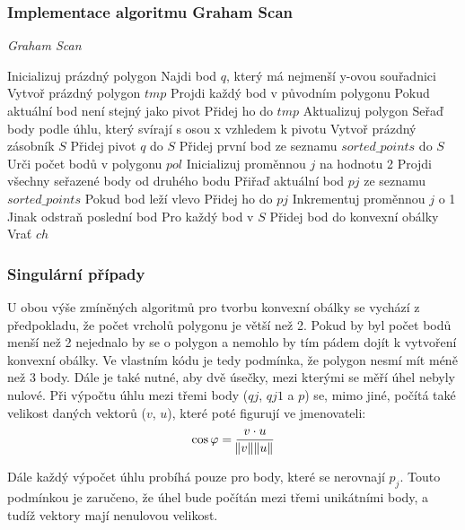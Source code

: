 \documentclass{article}
\begin{document}
\begin{spacing}{1.5}
\subsubsection*{Implementace algoritmu Graham Scan}
\begin{algorithm}
    \caption {\textit{Graham Scan}}
    \begin{algorithmic}[1]
        \State Inicializuj prázdný polygon
        \State Najdi bod $q$, který má nejmenší y-ovou souřadnici
        \State Vytvoř prázdný polygon $tmp$
        \State Projdi každý bod v původním polygonu
        \State \indent	Pokud aktuální bod není stejný jako pivot
        \State \indent	\indent	Přidej ho do $tmp$
        \State Aktualizuj polygon
        \State Seřaď body podle úhlu, který svírají s osou x vzhledem k pivotu
        \State Vytvoř prázdný zásobník $S$
        \State Přidej pivot $q$ do $S$
        \State Přidej první bod ze seznamu $sorted\_points$ do $S$
        \State Urči počet bodů v polygonu $pol$
        \State Inicializuj proměnnou $j$ na hodnotu 2
        \State Projdi všechny seřazené body od druhého bodu
        \State \indent	Přiřaď aktuální bod $pj$ ze seznamu $sorted\_points$
        \State \indent	Pokud bod leží vlevo
        \State \indent	\indent	Přidej ho do $pj$
        \State \indent	\indent	Inkrementuj proměnnou $j$ o 1
        \State \indent	Jinak odstraň poslední bod 
        \State Pro každý bod v $S$
        \State \indent	Přidej bod do konvexní obálky
        \State Vrať $ch$
    \end{algorithmic}
\end{algorithm}


\subsubsection{Singulární případy}
U obou výše zmíněných algoritmů pro tvorbu konvexní obálky se vychází z předpokladu, že počet vrcholů polygonu je větší než 2. Pokud by byl počet bodů menší než 2 nejednalo by se o polygon a nemohlo by tím pádem dojít k vytvoření konvexní obálky. Ve vlastním kódu je tedy podmínka, že polygon nesmí mít méně než 3 body.
Dále je také nutné, aby dvě úsečky, mezi kterými se měří úhel nebyly nulové. Při výpočtu úhlu mezi třemi body ($qj$, $qj1$ a $p$) se, mimo jiné, počítá také velikost daných vektorů ($v$, $u$), které poté figurují ve jmenovateli:
$$\cos\varphi=\frac{v \cdot u}{\norm{v}\norm{u}}$$

Dále každý výpočet úhlu probíhá pouze pro body, které se nerovnají $p_j$. Touto podmínkou je zaručeno, že úhel bude počítán mezi třemi unikátními body, a tudíž vektory mají nenulovou velikost. 



\end{spacing}
\end{document}
